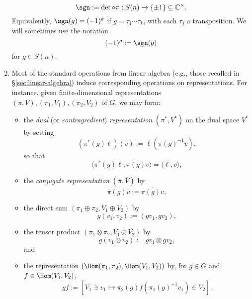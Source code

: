 \documentclass[reqno]{amsart} 
\begin{document}
\begin{example}
\begin{enumerate}
    \begin{equation*}
      \sgn := \det \circ \pi : S(n) \rightarrow \{\pm 1\} \subseteq \mathbb{C}^\times.
    \end{equation*}
    Equivalently, $\sgn(g) = (-1)^k$ if $g = \tau_1 \dotsb \tau_k$, with each $\tau_j$ a transposition.  We will sometimes use the notation
    \begin{equation*}
      (-1)^g := \sgn(g)
    \end{equation*}
    for $g \in S(n)$.
  \item Most of the standard operations from linear algebra (e.g., those recalled in \S\ref{sec:linear-algebra}) induce corresponding operations on representations.  For instance, given finite-dimensional representations $(\pi,V),(\pi_1,V_1),(\pi_2,V_2)$ of $G$, we may form:
    \begin{itemize}
    \item the \emph{dual} (or \emph{contragredient}) \emph{representation} $(\pi^*, V^*)$ on the dual space $V^*$ by setting
      \begin{equation*}
        (\pi^*(g) \ell)(v) := \ell(\pi(g)^{-1} v),
      \end{equation*}
      so that
      \begin{equation*}
        \langle \pi^*(g) \ell, \pi(g) v \rangle = \langle \ell, v \rangle,
      \end{equation*}
    \item the \emph{conjugate representation} $(\overline{\pi}, \overline{V})$ by
      \begin{equation*}
        \overline{\pi }(g) \overline{v} := \overline{\pi(g) v},
      \end{equation*}
    \item the direct sum $(\pi_1 \oplus \pi_2, V_1 \oplus V_2)$ by
      \begin{equation*}
        g (v_1, v_2) := (g v_1, g v_2),
      \end{equation*}
    \item the tensor product $(\pi_1 \otimes \pi_2, V_1 \otimes V_2)$ by
      \begin{equation*}
        g (v_1 \otimes v_2) := g v_1 \otimes g v_2,
      \end{equation*}
      and
    \item the representation $(\Hom(\pi_1,\pi_2), \Hom(V_1,V_2))$ by, for $g \in G$ and $f \in \Hom(V_1,V_2)$,
      \begin{equation*}
        g f := [V_1 \ni v_1 \mapsto \pi_2(g) f(\pi_1(g)^{-1} v_1) \in V_2 ].
      \end{equation*}
    \end{itemize}
  \end{enumerate}
\end{example}
\end{document}
